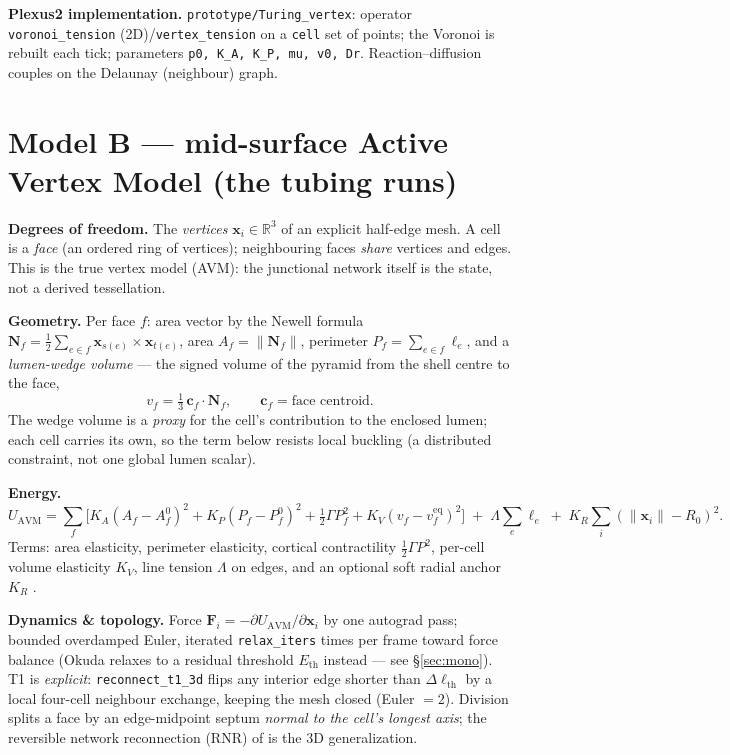 \documentclass[11pt]{article}
\begin{document}
\textbf{Plexus2 implementation.} \texttt{prototype/Turing\_vertex}: operator \texttt{voronoi\_tension}
(2D)/\texttt{vertex\_tension} on a \texttt{cell} set of points; the Voronoi is rebuilt each tick; parameters
\texttt{p0, K\_A, K\_P, mu, v0, Dr}. Reaction--diffusion couples on the Delaunay (neighbour) graph.

\section{Model B --- mid-surface Active Vertex Model (the tubing runs)}
\textbf{Degrees of freedom.} The \emph{vertices} $\mathbf{x}_i\in\mathbb{R}^3$ of an explicit half-edge mesh.
A cell is a \emph{face} (an ordered ring of vertices); neighbouring faces \emph{share} vertices and edges.
This is the true vertex model (AVM): the junctional network itself is the state, not a derived tessellation.

\textbf{Geometry.} Per face $f$: area vector by the Newell formula
$\mathbf{N}_f=\tfrac12\sum_{e\in f}\mathbf{x}_{s(e)}\times\mathbf{x}_{t(e)}$, area $A_f=\|\mathbf{N}_f\|$,
perimeter $P_f=\sum_{e\in f}\ell_e$, and a \emph{lumen-wedge volume} --- the signed volume of the pyramid
from the shell centre to the face,
\begin{equation}
v_f=\tfrac13\,\mathbf{c}_f\!\cdot\!\mathbf{N}_f,\qquad \mathbf{c}_f=\text{face centroid}.
\end{equation}
The wedge volume is a \emph{proxy} for the cell's contribution to the enclosed lumen; each cell carries its
own, so the term below resists local buckling (a distributed constraint, not one global lumen scalar).

\textbf{Energy.}
\begin{equation}
U_{\text{AVM}}=\sum_f\Big[K_A(A_f-A_f^0)^2+K_P(P_f-P_f^0)^2+\tfrac12\Gamma P_f^2+K_V(v_f-v_f^{\text{eq}})^2\Big]
\;+\;\Lambda\!\sum_e \ell_e \;+\;K_R\!\sum_i(\|\mathbf{x}_i\|-R_0)^2 .
\label{eq:avm}
\end{equation}
Terms: area elasticity, perimeter elasticity, cortical contractility $\tfrac12\Gamma P^2$, per-cell volume
elasticity $K_V$, line tension $\Lambda$ on edges, and an optional soft radial anchor $K_R$
\cite{farhadifar2007,okuda2013,okuda2015}.

\textbf{Dynamics \& topology.} Force $\mathbf{F}_i=-\partial U_{\text{AVM}}/\partial\mathbf{x}_i$ by one
autograd pass; bounded overdamped Euler, iterated \texttt{relax\_iters} times per frame toward force balance
(Okuda relaxes to a residual threshold $E_{\text{th}}$ instead --- see \S\ref{sec:mono}). T1 is
\emph{explicit}: \texttt{reconnect\_t1\_3d} flips any interior edge shorter than $\Delta\ell_{\text{th}}$ by a
local four-cell neighbour exchange, keeping the mesh closed (Euler $=2$). Division splits a face by an
edge-midpoint septum \emph{normal to the cell's longest axis}; the reversible network reconnection (RNR) of
\cite{okuda2013} is the 3D generalization.
\end{document}
